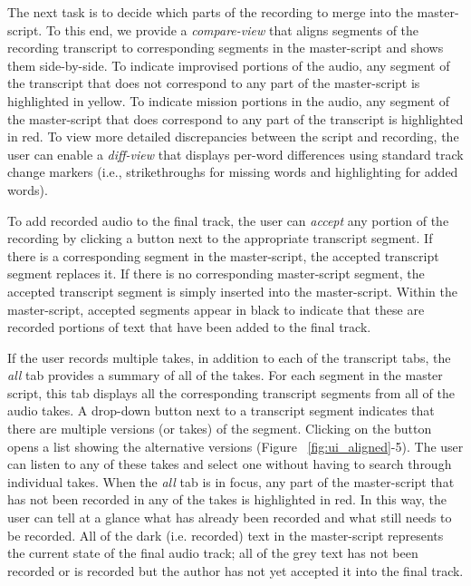 The next task is to decide which parts of the recording to merge into the master-script. To this end, we provide a \textit{compare-view} that aligns segments of the recording transcript to corresponding segments in the master-script and shows them side-by-side. To indicate improvised portions of the audio, any segment of the transcript that does not correspond to any part of the master-script is highlighted in yellow. To indicate mission portions in the audio, any segment of the master-script that does correspond to any part of the transcript is highlighted in red. To
view more detailed discrepancies between the script and recording, the
user can enable a \textit{diff-view} that displays per-word differences
using standard track change markers (i.e., strikethroughs for
missing words and highlighting for added words). 


To add recorded audio to the final track, the user can \textit{accept} any portion of the recording by clicking a button next to the appropriate transcript segment. If there is a corresponding segment in the master-script, the accepted transcript segment replaces it. If there is no corresponding master-script segment, the accepted transcript segment is simply inserted into the master-script. Within the master-script, accepted segments appear in black to indicate that these are recorded portions of text that have been added to the final track. 


If the user records multiple takes, in addition to each of the transcript tabs, the \textit{all} tab provides a summary of all of the takes. For each segment in the master script, this tab displays all the corresponding transcript segments from all of the audio takes. A drop-down button next to a transcript segment  indicates that there are multiple versions (or takes)  of the  segment. Clicking on the button opens a list showing the alternative versions (Figure ~\ref{fig:ui_aligned}-5). The user can listen to any of these takes and select one without having to search through individual takes. 
When the \textit{all} tab is in focus, any part of the master-script that has not been recorded in any of the takes is highlighted in red. In this way, the user can tell at a glance what has already been recorded and what still needs to be recorded. All of the dark (i.e. recorded) text in the master-script represents the current state of the final audio track; all of the grey text has not been recorded or is recorded but the author has not yet accepted it into the final track. 

